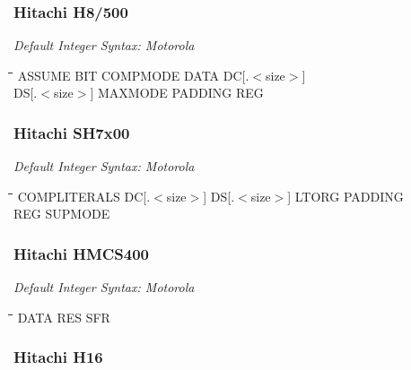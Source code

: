\subsubsection{Hitachi H8/500}

{\em Default Integer Syntax: Motorola}

{\tt\begin{tabbing}
\hspace{3cm}\=\hspace{3cm}\=\hspace{3cm}\=\hspace{3cm}\=\kill
ASSUME          \> BIT    \> COMPMODE \> DATA   \> DC[.$<$size$>$] \\
DS[.$<$size$>$] \> MAXMODE \> PADDING \> REG \\
\end{tabbing}}

\subsubsection{Hitachi SH7x00}

{\em Default Integer Syntax: Motorola}

{\tt\begin{tabbing}
\hspace{3cm}\=\hspace{3cm}\=\hspace{3cm}\=\hspace{3cm}\=\kill
COMPLITERALS \> DC[.$<$size$>$]  \>  DS[.$<$size$>$]  \>  LTORG    \> PADDING \\
REG          \> SUPMODE \\
\end{tabbing}}

\subsubsection{Hitachi HMCS400}

{\em Default Integer Syntax: Motorola}

{\tt\begin{tabbing}
\hspace{3cm}\=\hspace{3cm}\=\hspace{3cm}\=\hspace{3cm}\=\kill
DATA       \> RES         \> SFR \\
\end{tabbing}}

\subsubsection{Hitachi H16}

